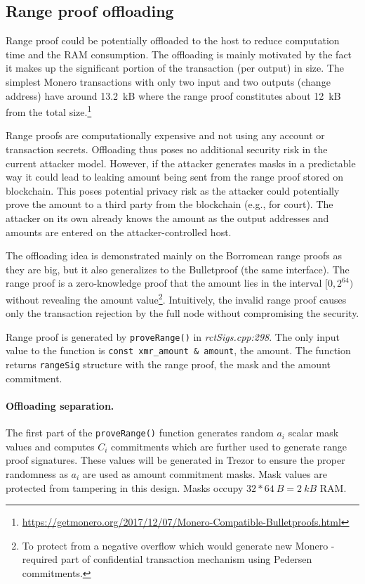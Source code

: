 \documentclass[]{article}
\begin{document}
\subsection{Range proof offloading}
Range proof could be potentially offloaded to the host to reduce computation time and the RAM consumption.
The offloading is mainly motivated by the fact it makes up the significant portion of the transaction (per output) in size. The simplest Monero transactions with only two input and two outputs (change address) have around 
13.2~kB where the range proof constitutes about 12~kB from the total size.\footnote{\url{https://getmonero.org/2017/12/07/Monero-Compatible-Bulletproofs.html}}
 
Range proofs are computationally expensive and not using any account or transaction secrets. Offloading thus poses no additional security risk in the current attacker model. However, if the attacker generates masks in a predictable way it could lead to leaking amount being sent from the range proof stored on blockchain. This poses potential privacy risk as the attacker could potentially prove the amount to a third party from the blockchain (e.g., for court). The attacker on its own already knows the amount as the output addresses and amounts are entered on the attacker-controlled host.
  
The offloading idea is demonstrated mainly on the Borromean range proofs as they are big, but it also generalizes to the Bulletproof (the same interface). 
The range proof is a zero-knowledge proof that the amount lies in the interval $[0, 2^{64})$ without revealing the amount value\footnote{To protect from a negative overflow which would generate new Monero - required part of confidential transaction mechanism using Pedersen commitments.}. Intuitively, the invalid range proof causes only the transaction rejection by the full node without compromising the security.

Range proof is generated by \verb|proveRange()| in \emph{rctSigs.cpp:298}. The only input value to the function is \verb|const xmr_amount & amount|, the amount. The function returns \verb|rangeSig| structure with the range proof, the mask and the amount commitment. 

\paragraph{Offloading separation.}
The first part of the \verb|proveRange()| function generates random $a_i$ scalar mask values and computes $C_i$ commitments which are further used to generate range proof signatures. These values will be generated in Trezor to ensure the proper randomness as $a_i$ are used as amount commitment masks. Mask values are protected from tampering in this design. Masks occupy $32*64~B = 2~kB$ RAM.
\end{document}
